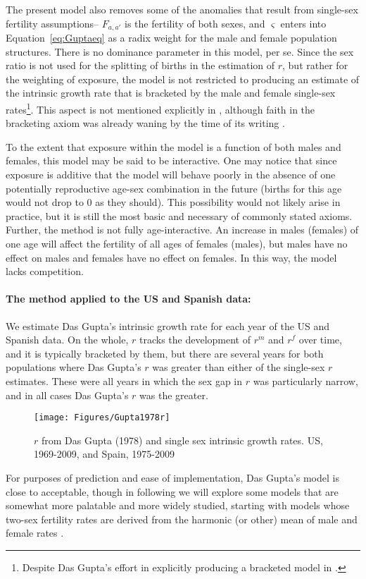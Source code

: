 The present model also removes some of the anomalies that
result from single-sex fertility assumptions-- $F_{a,a'}$ is the fertility of
both sexes, and $\varsigma$ enters into Equation~\eqref{eq:Guptaeq} as a radix
weight for the male and female population structures. There is no dominance
parameter in this model, per se. Since the sex ratio is not used for the
splitting of births in the estimation of $r$, but rather for the weighting of exposure,
the model is not restricted to producing an estimate of the intrinsic growth 
rate that is bracketed by the male and female single-sex rates\footnote{Despite Das Gupta's effort in
explicitly producing a bracketed model in \citet{gupta1976interactive}.}. This
aspect is not mentioned explicitly in \citet{gupta1978alternative}, although
faith in the bracketing axiom was already waning by the time of its writing
\citep{yellin1977comparison}.
 
 To the extent that exposure within the model is a function of both males and
 females, this model may be said to be interactive. One may notice that since
 exposure is additive that the model will behave poorly in the absence of one
 potentially reproductive age-sex combination in the future (births for this
 age would not drop to 0 as they should). This possibility would not likely
 arise in practice, but it is still the most basic and necessary of
 commonly stated axioms. Further, the method is not fully age-interactive. An
 increase in males (females) of one age will affect the fertility of all ages of
 females (males), but males have no effect on males and females have no effect
 on females. In this way, the model lacks competition.

\paragraph{The method applied to the US and Spanish data: } We estimate Das
Gupta's intrinsic growth rate for each year of the US and Spanish data. On the
whole, $r$ tracks the development of $r^m$ and $r^f$ over time, and it is
typically bracketed by them, but there are several years for both populations
where Das Gupta's $r$ was greater than either of the single-sex $r$ estimates.
These were all years in which the sex gap in $r$ was particularly narrow, and in
all cases Das Gupta's $r$ was the greater.

\begin{figure}[ht!]
        \centering  
          \caption{$r$ from Das Gupta (1978) and single sex intrinsic growth rates. US, 1969-2009, and Spain, 1975-2009}
           \texttt{[image: Figures/Gupta1978r]}
          \label{fig:Gupta1978r}
\end{figure}

For purposes of prediction and ease of implementation, Das Gupta's model is
close to acceptable, though in following we will explore some models that are
somewhat more palatable and more widely studied, starting with models whose
two-sex fertility rates are derived from the harmonic (or other) mean of male
and female rates \citet{schoen1981harmonic}.

\FloatBarrier
